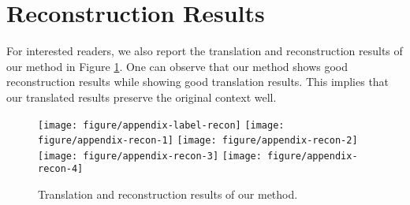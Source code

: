\documentclass{article} \usepackage{iclr2019_conference,times}
\begin{document}
\newpage
\section{Reconstruction Results}

For interested readers, we also report the translation and reconstruction results of our method in Figure
\ref{fig:recon}. One can observe that 
our method shows good reconstruction results while showing good translation results.
This implies that our translated results preserve the original context well.




\begin{figure}[H]
	\centering
	\texttt{[image: figure/appendix-label-recon]}
	\texttt{[image: figure/appendix-recon-1]}
    \texttt{[image: figure/appendix-recon-2]}
    \texttt{[image: figure/appendix-recon-3]}
    \texttt{[image: figure/appendix-recon-4]}
	\caption{
	Translation and reconstruction results of our method.
	} \label{fig:recon}
\end{figure} 
\end{document}
